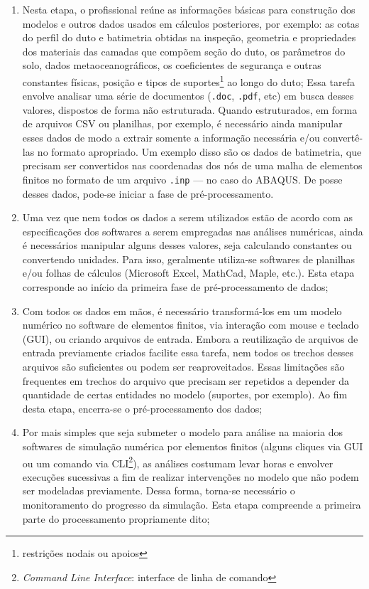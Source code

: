 \begin{enumerate}[label= (\arabic*)]
    \item Nesta etapa, o profissional reúne as informações básicas para construção dos modelos e outros dados usados em cálculos posteriores, por exemplo: as cotas do perfil do duto e batimetria obtidas na inspeção, geometria e propriedades dos materiais das camadas que compõem seção do duto, os parâmetros do solo, dados metaoceanográficos, os coeficientes de segurança e outras constantes físicas, posição e tipos de suportes\footnote{restrições nodais ou apoios} ao longo do duto;
    Essa tarefa envolve analisar uma série de documentos (\texttt{.doc}, \texttt{.pdf}, etc) em busca desses valores, dispostos de forma não estruturada. Quando estruturados, em forma de arquivos CSV ou planilhas, por exemplo, é necessário ainda manipular esses dados de modo a extrair somente a informação necessária e/ou convertê-las no formato apropriado. Um exemplo disso são os dados de batimetria, que precisam ser convertidos nas coordenadas dos nós de uma malha de elementos finitos no formato de um arquivo \texttt{.inp} --- no caso do ABAQUS. De posse desses dados, pode-se iniciar a fase de pré-processamento.
    \item Uma vez que nem todos os dados a serem utilizados estão de acordo com as especificações dos softwares a serem empregadas nas análises numéricas, ainda é necessários manipular alguns desses valores, seja calculando constantes ou convertendo unidades. Para isso, geralmente utiliza-se softwares de planilhas e/ou folhas de cálculos (Microsoft Excel, MathCad, Maple, etc.). Esta etapa corresponde ao início da primeira fase de pré-processamento de dados;
    \item Com todos os dados em mãos, é necessário transformá-los em um modelo numérico no software de elementos finitos, via interação com mouse e teclado (GUI), ou criando arquivos de entrada. Embora a reutilização de arquivos de entrada previamente criados facilite essa tarefa, nem todos os trechos desses arquivos são suficientes ou podem ser reaproveitados. Essas limitações são frequentes em trechos do arquivo que precisam ser repetidos a depender da quantidade de certas entidades no modelo (suportes, por exemplo). Ao fim desta etapa, encerra-se o pré-processamento dos dados;
    \item Por mais simples que seja submeter o modelo para análise na maioria dos softwares de simulação numérica por elementos finitos (alguns cliques via GUI ou um comando via CLI\footnote{\textit{Command Line Interface}: interface de linha de comando}), as análises costumam levar horas e envolver execuções sucessivas a fim de realizar intervenções no modelo que não podem ser modeladas previamente. Dessa forma, torna-se necessário o monitoramento do progresso da simulação. Esta etapa compreende a primeira parte do processamento propriamente dito;

\end{enumerate}
